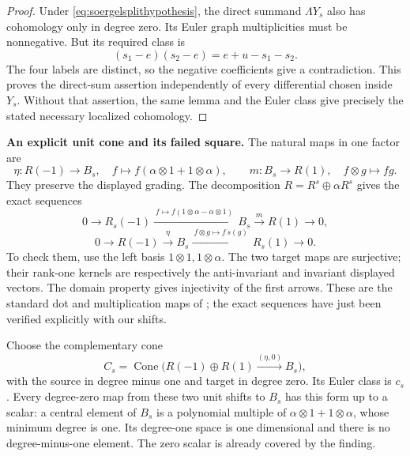 \documentclass[11pt,a4paper]{article}
\renewcommand{\S}{\ensuremath{\mathsection}}
\theoremstyle{named}\newtheorem{finding}{Finding}[section]
\theoremstyle{definition}\newtheorem{definition}[finding]{Definition}
\theoremstyle{remark}\newtheorem{remark}[finding]{Remark}
\begin{document}
\begin{proof}
Under \eqref{eq:soergelsplithypothesis}, the direct
summand \(\Lambda Y_s\) also has cohomology only in degree
zero. Its Euler graph multiplicities must be nonnegative.
But its required class is
\[
             (s_1-e)(s_2-e)=e+u-s_1-s_2.
\]
The four labels are distinct, so the negative coefficients
give a contradiction. This proves the direct-sum assertion
independently of every differential chosen inside \(Y_s\).
Without that assertion, the same lemma and the Euler class
give precisely the stated necessary localized cohomology.
\end{proof}

\par\smallskip\noindent\textbf{An explicit unit cone and its failed square.}\quad
The natural maps in one factor are
\[
 \eta:R(-1)\longrightarrow B_s,
 \quad f\longmapsto f(\alpha\otimes1+1\otimes\alpha),
 \qquad
 m:B_s\longrightarrow R(1),\quad f\otimes g\longmapsto fg.
\]
They preserve the displayed grading. The decomposition
\(R=R^s\oplus\alpha R^s\) gives the exact sequences
\begin{equation}\label{eq:soergelcounitexact}
 0\longrightarrow R_s(-1)
 \xrightarrow{\ f\mapsto f(1\otimes\alpha-\alpha\otimes1)\ }
 B_s\xrightarrow{m}R(1)\longrightarrow0,
\end{equation}
\begin{equation}\label{eq:soergelunitexact}
 0\longrightarrow R(-1)\xrightarrow{\eta}B_s
 \xrightarrow{\ f\otimes g\mapsto f\,s(g)\ }R_s(1)
 \longrightarrow0.
\end{equation}
To check them, use the left basis
\(1\otimes1,1\otimes\alpha\). The two target maps are
surjective; their rank-one kernels are respectively the
anti-invariant and invariant displayed vectors. The domain
property gives injectivity of the first arrows. These are
the standard dot and multiplication maps of
\cite[\S3.4, pp.~1106--1107]{EW}; the exact sequences have
just been verified explicitly with our shifts.

Choose the complementary cone
\[
 C_s=\operatorname{Cone}\bigl(
 R(-1)\oplus R(1)\xrightarrow{(\eta,0)}B_s\bigr),
\]
with the source in degree minus one and target in degree
zero. Its Euler class is \(c_s\). Every degree-zero map
from these two unit shifts to \(B_s\) has this form up to
a scalar: a central element of \(B_s\) is a polynomial
multiple of \(\alpha\otimes1+1\otimes\alpha\), whose
minimum degree is one. Its degree-one space is one
dimensional and there is no degree-minus-one element.
The zero scalar is already covered by the finding.
\end{document}
